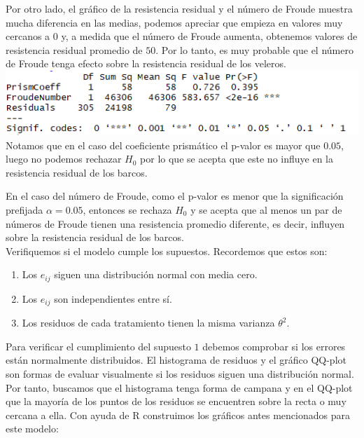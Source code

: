 \documentclass[twoside]{article}
\begin{document}
\begin{multicols}{2}
Por otro lado, el gr\'afico de la resistencia residual y el n\'umero de Froude muestra mucha diferencia en las medias, podemos apreciar que empieza en valores muy cercanos a $0$ y, a medida que el n\'umero de Froude aumenta, obtenemos valores de resistencia residual promedio de $50$. Por lo tanto, es muy probable que el n\'umero de Froude tenga efecto sobre la resistencia residual de los veleros.\\

\includegraphics[scale = 0.4]{images/pic_14.png} \\

Notamos que en el caso del coeficiente prism\'atico el p-valor es mayor que $0.05$, luego no podemos rechazar $H_0$ por lo que se acepta que este no influye en la resistencia residual de los barcos.

En el caso del n\'umero de Froude, como el p-valor es menor que la significaci\'on prefijada $\alpha = 0.05$, entonces se rechaza $H_0$ y se acepta que al menos un par de n\'umeros de Froude tienen una resistencia promedio diferente, es decir, influyen sobre la resistencia residual de los barcos.\\

Verifiquemos si el modelo cumple los supuestos. Recordemos que estos son:
\begin{enumerate}
\item Los $e_{ij}$ siguen una distribuci\'on normal con media cero. 
\item Los $e_{ij}$ son independientes entre s\'i. 
\item Los residuos de cada tratamiento tienen la misma varianza $\theta^2$.\\
\end{enumerate}

Para verificar el cumplimiento del supuesto $1$ debemos comprobar si los errores est\'an normalmente distribuidos. El histograma de residuos y el gr\'afico QQ-plot son formas de evaluar visualmente si los residuos siguen una distribuci\'on normal. Por tanto, buscamos que el histograma tenga forma de campana y en el QQ-plot que la mayor\'ia de los puntos de los residuos se encuentren sobre la recta o muy cercana a ella. Con ayuda de R construimos los gr\'aficos antes mencionados para este modelo:\\


\end{multicols}
\end{document}
